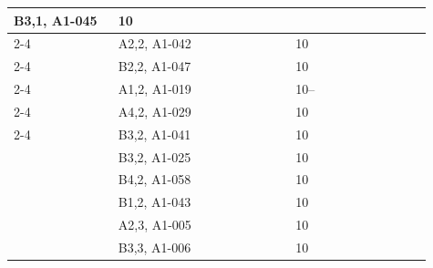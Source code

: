 \documentclass[UTF8,10pt,a4paper,fontset=fandol]{ctexart}
\newcommand{\fieldvalue}[1]{#1}
\newcommand{\handwritten}[1]{#1}
\begin{document}
\begin{center}
\begin{tabular}{|p{0.23\linewidth}|p{0.39\linewidth}|p{0.18\linewidth}|p{0.12\linewidth}|}
\fieldvalue{\handwritten{B3,1, A1-045}} &
\fieldvalue{\handwritten{10}} & \tabularnewline
\cline{2-4}
&
\fieldvalue{\handwritten{A2,2, A1-042}} &
\fieldvalue{\handwritten{10}} & \tabularnewline
\cline{2-4}
&
\fieldvalue{\handwritten{B2,2, A1-047}} &
\fieldvalue{\handwritten{10}} & \tabularnewline
\cline{2-4}
&
\fieldvalue{\handwritten{A1,2, A1-019}} &
\fieldvalue{\handwritten{10--}} & \tabularnewline
\cline{2-4}
&
\fieldvalue{\handwritten{A4,2, A1-029}} &
\fieldvalue{\handwritten{10}} & \tabularnewline
\cline{2-4}
&
\fieldvalue{\handwritten{B3,2, A1-041}} &
\fieldvalue{\handwritten{10}} & \tabularnewline
\hline
&
\fieldvalue{\handwritten{B3,2, A1-025}} &
\fieldvalue{\handwritten{10}} & \tabularnewline
\hline
&
\fieldvalue{\handwritten{B4,2, A1-058}} &
\fieldvalue{\handwritten{10}} & \tabularnewline
\hline
&
\fieldvalue{\handwritten{B1,2, A1-043}} &
\fieldvalue{\handwritten{10}} & \tabularnewline
\hline
&
\fieldvalue{\handwritten{A2,3, A1-005}} &
\fieldvalue{\handwritten{10}} & \tabularnewline
\hline
&
\fieldvalue{\handwritten{B3,3, A1-006}} &
\fieldvalue{\handwritten{10}} & \tabularnewline
\hline
\end{tabular}
\end{center}
\end{document}
